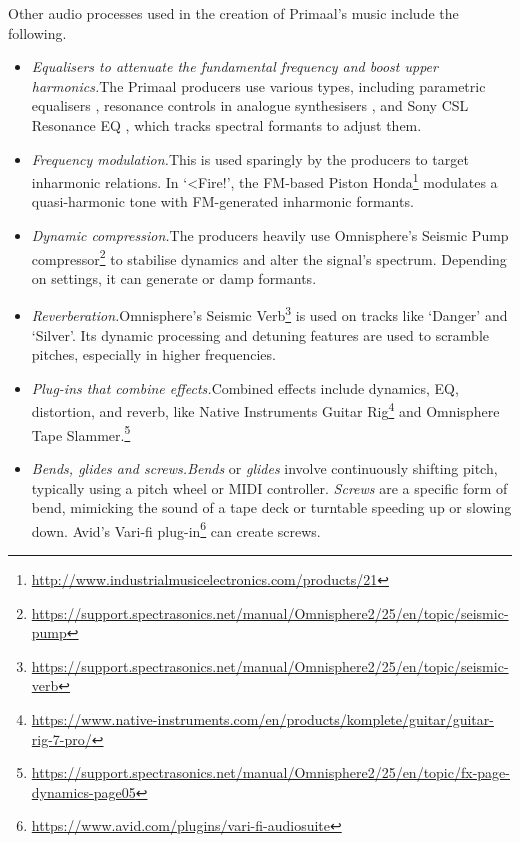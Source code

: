 \documentclass{article}
\begin{document}
Other audio processes used in the creation of Primaal's music include the following.

\begin{itemize}[noitemsep]

\item {\em Equalisers to attenuate the fundamental frequency and boost upper harmonics.}\quad The Primaal producers use various types, including parametric equalisers \citep{massenburg1972parametric}, resonance controls in analogue synthesisers \citep{moog1965voltage}, and Sony CSL Resonance EQ \citep{grachten2019req}, which tracks spectral formants to adjust them.


\item {\em Frequency modulation.}\quad This is used sparingly by the producers to target inharmonic relations. In `<Fire!', the FM-based Piston Honda\footnote{\url{http://www.industrialmusicelectronics.com/products/21}} modulates a quasi-harmonic tone with FM-generated inharmonic formants. 

\item {\em Dynamic compression.}\quad The producers heavily use Omnisphere's Seismic Pump compressor\footnote{\url{https://support.spectrasonics.net/manual/Omnisphere2/25/en/topic/seismic-pump}} to stabilise dynamics and alter the signal's spectrum. Depending on settings, it can generate or damp formants.

\item {\em Reverberation.}\quad Omnisphere's Seismic Verb\footnote{\url{https://support.spectrasonics.net/manual/Omnisphere2/25/en/topic/seismic-verb}} is used on tracks like `Danger' and `Silver'. Its dynamic processing and detuning features are used to scramble pitches, especially in higher frequencies.

\item {\em Plug-ins that combine effects.}\quad Combined effects include dynamics, EQ, distortion, and reverb, like Native Instruments Guitar Rig\footnote{\url{https://www.native-instruments.com/en/products/komplete/guitar/guitar-rig-7-pro/}} and Omnisphere Tape Slammer.\footnote{\url{https://support.spectrasonics.net/manual/Omnisphere2/25/en/topic/fx-page-dynamics-page05}}


\item {\em Bends, glides and screws.}\quad\emph{Bends} or \emph{glides} involve continuously shifting pitch, typically using a pitch wheel or MIDI controller. \emph{Screws} are a specific form of bend, mimicking the sound of a tape deck or turntable speeding up or slowing down. Avid's Vari-fi plug-in\footnote{\url{https://www.avid.com/plugins/vari-fi-audiosuite}} can create screws.

\end{itemize}
\end{document}
